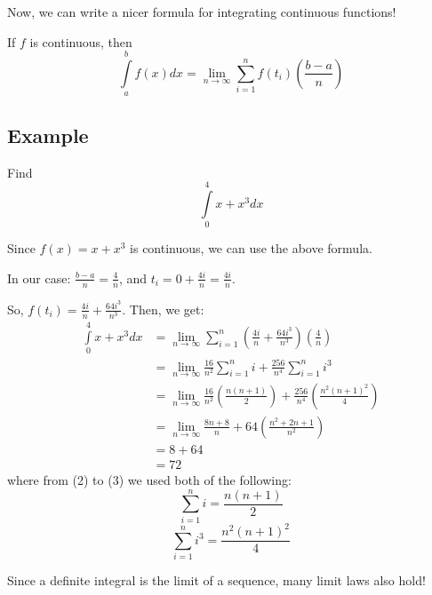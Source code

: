 Now, we can write a nicer formula for integrating continuous functions!

If $ f $ is continuous, then
\[ \int\limits_{a}^{b} f(x) d{x} = 
\lim\limits_{{n} \to {\infty}} \sum\limits_{i=1}^{n} f(t_i)\left(\frac{b-a}{n}\right) \]

\subsection{Example}
Find 
\[ \int\limits_{0}^{4} x+x^3 d{x} \]

Since $ f(x)=x+x^3 $ is continuous, we can use the above formula.

In our case: $ \frac{b-a}{n} = \frac{4}{n} $, and $ t_i = 0+\frac{4i}{n} = \frac{4i}{n} $.

So, $ f(t_i) = \frac{4i}{n} + \frac{64i^3}{n^3} $.
Then, we get:
\begin{align}
    \int\limits_{0}^{4} x+x^3 d{x} 
    &= \lim\limits_{{n} \to {\infty}} \sum\limits_{i=1}^{n}
        \left( \frac{4i}{n} +\frac{64i^3}{n^3} \right)\left( \frac{4}{n} \right)\\
    &= \lim\limits_{{n} \to {\infty}} \frac{16}{n^2} \sum\limits_{i=1}^{n} i +
        \frac{256}{n^4} \sum\limits_{i=1}^{n} i^3\\
    &= \lim\limits_{{n} \to {\infty}} \frac{16}{n^2} \left( \frac{n(n+1)}{2} \right) +
        \frac{256}{n^4} \left( \frac{n^2(n+1)^2}{4} \right)\\
    &= \lim\limits_{{n} \to {\infty}} \frac{8n+8}{n} +64 \left(\frac{n^2+2n+1}{n^2} \right)\\
    &= 8+64\\
    &=72
\end{align}
where from (2) to (3) we used both of the following:
\[ \sum\limits_{i=1}^{n} i=\frac{n(n+1)}{2} \]
\[ \sum\limits_{i=1}^{n} i^3=\frac{n^2(n+1)^2}{4} \]

Since a definite integral is the limit of a sequence, many limit laws also hold!

